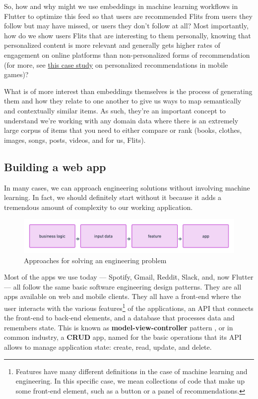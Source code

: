 \documentclass[draft, 11pt]{diazessay} %
\begin{document}
So, how and why might we use embeddings in machine learning workflows in Flutter to optimize this feed so that users are recommended Flits from users they follow but may have missed, or users they don’t follow at all?  Most importantly, how do we show users Flits that are interesting to them personally, knowing that personalized content is more relevant and generally gets higher rates of engagement\citep{jannach2010recommender}  on online platforms than non-personalized forms of recommendation (for more, see  \href{http://www.recommenderbook.net/media/Recommender_Systems_An_Introduction_Chapter08_Case_study.pdf}{this case study} on personalized recommendations in mobile games)? 

What is of more interest than embeddings themselves is the process of generating them and how they relate to one another to give us ways to map semantically and contextually similar items. As such, they’re an important concept to understand we're working with any domain data where there is an extremely large corpus of items that you need to either compare or rank (books, clothes, images, songs, posts, videos, and for us, Flits).


\subsection{Building a web app}
In many cases, we can approach engineering solutions without involving machine learning. In fact, we should definitely start without it\citep{zinkevich2017rules} because it adds a tremendous amount of complexity to our working application\citep{sculley2014machine}. 

\begin{figure}[!ht]
\centering
\includegraphics[width=\textwidth]{figures/solutions.png}
\caption{Approaches for solving an engineering problem }
\end{figure}

Most of the apps we use today --- Spotify, Gmail, Reddit, Slack, and, now Flutter ---   all follow the same basic software engineering design patterns. They are all apps available on web and mobile clients. They all have a front-end where the user interacts with the various features\footnote{Features have many different definitions in the case of machine learning and engineering. In this specific case, we mean collections of code that make up some front-end element, such as a button or a panel of recommendations.} of the applications, an API that connects the front-end to back-end elements, and a database that processes data and remembers state. This is known as \textbf{model-view-controller} pattern \citep{fowler2012patterns}, or in common industry, a \textbf{CRUD} app, named for the basic operations that its API allows to manage application state: create, read, update, and delete. 
 
\end{document}
